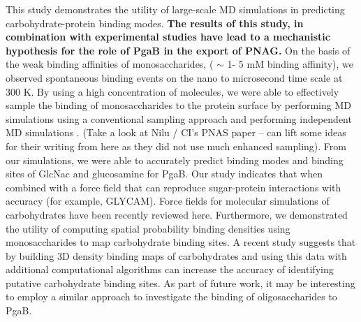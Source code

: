 {This study demonstrates the utility of large-scale MD simulations in predicting carbohydrate-protein binding modes. \textbf{The results of this study, in combination with experimental studies have lead to a mechanistic hypothesis for the role of PgaB in the export of PNAG.} 
On the basis of the weak binding affinities of monosaccharides,  %
( $\sim$ 1- 5 mM binding affinity), we observed spontaneous binding events on the nano to microsecond time scale at 300 K.  By using a high concentration of molecules, we were able to effectively sample the binding of monosaccharides to the protein surface by performing MD simulations using a conventional sampling approach and performing independent MD simulations . (Take a look at Nilu / CI's PNAS paper -- can lift some ideas for their writing from here as they did not use much enhanced sampling).
From our simulations, we were able to accurately predict binding modes and binding sites of GlcNac and glucosamine for PgaB. Our study indicates that when combined with a force field that can reproduce sugar-protein interactions with accuracy (for example, GLYCAM\cite{Kirschner:2008ii}). Force fields for molecular simulations of carbohydrates have been recently reviewed here.\cite{Fadda:2010p5889} Furthermore, we demonstrated the utility of computing spatial probability binding densities using monosaccharides to map carbohydrate binding sites. A recent study suggests that by building 3D density binding maps of carbohydrates and using this data with additional computational algorithms can increase the accuracy of identifying putative carbohydrate binding sites.\cite{Tsai:2012bj} As part of future work, it may be interesting to employ a similar approach to investigate the binding of oligosaccharides to PgaB.



}
